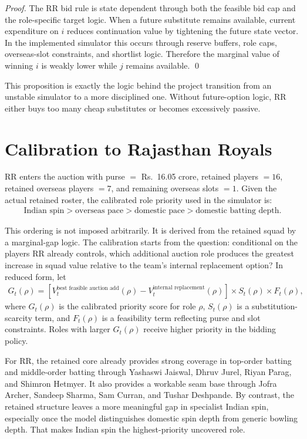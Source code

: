 \documentclass[11pt]{article}
\begin{document}
\begin{proof}
The RR bid rule is state dependent through both the feasible bid cap and the role-specific target logic. When a future substitute remains available, current expenditure on \(i\) reduces continuation value by tightening the future state vector. In the implemented simulator this occurs through reserve buffers, role caps, overseas-slot constraints, and shortlist logic. Therefore the marginal value of winning \(i\) is weakly lower while \(j\) remains available. \qed
\end{proof}

This proposition is exactly the logic behind the project transition from an unstable simulator to a more disciplined one. Without future-option logic, RR either buys too many cheap substitutes or becomes excessively passive.

\section{Calibration to Rajasthan Royals}

RR enters the auction with purse \(=\) Rs.\ 16.05 crore, retained players \(=16\), retained overseas players \(=7\), and remaining overseas slots \(=1\). Given the actual retained roster, the calibrated role priority used in the simulator is:
\begin{align}
\text{Indian spin} > \text{overseas pace} > \text{domestic pace} > \text{domestic batting depth}.
\end{align}

This ordering is not imposed arbitrarily. It is derived from the retained squad by a marginal-gap logic. The calibration starts from the question: conditional on the players RR already controls, which additional auction role produces the greatest increase in squad value relative to the team's internal replacement option? In reduced form, let
\begin{align}
G_t(\rho)=\left[V_t^{\text{best feasible auction add}}(\rho)-V_t^{\text{internal replacement}}(\rho)\right]\times S_t(\rho)\times F_t(\rho),
\end{align}
where \(G_t(\rho)\) is the calibrated priority score for role \(\rho\), \(S_t(\rho)\) is a substitution-scarcity term, and \(F_t(\rho)\) is a feasibility term reflecting purse and slot constraints. Roles with larger \(G_t(\rho)\) receive higher priority in the bidding policy.

For RR, the retained core already provides strong coverage in top-order batting and middle-order batting through Yashaswi Jaiswal, Dhruv Jurel, Riyan Parag, and Shimron Hetmyer. It also provides a workable seam base through Jofra Archer, Sandeep Sharma, Sam Curran, and Tushar Deshpande. By contrast, the retained structure leaves a more meaningful gap in specialist Indian spin, especially once the model distinguishes domestic spin depth from generic bowling depth. That makes Indian spin the highest-priority uncovered role.
\end{document}
